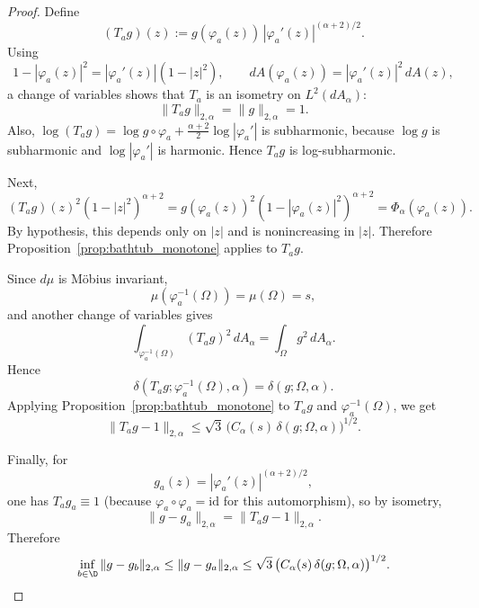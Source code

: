 \begin{proof}
Define
\[
(T_ag)(z):=g(\varphi_a(z))\,|\varphi_a'(z)|^{(\alpha+2)/2}.
\]
Using
\[
1-|\varphi_a(z)|^2 = |\varphi_a'(z)|(1-|z|^2),
\qquad
dA(\varphi_a(z))=|\varphi_a'(z)|^2\,dA(z),
\]
a change of variables shows that $T_a$ is an isometry on $L^2(dA_\alpha)$:
\[
\|T_ag\|_{2,\alpha}=\|g\|_{2,\alpha}=1.
\]
Also, $\log(T_ag)=\log g\circ \varphi_a + \frac{\alpha+2}{2}\log|\varphi_a'|$ is subharmonic,
because $\log g$ is subharmonic and $\log|\varphi_a'|$ is harmonic. Hence $T_ag$ is log-subharmonic.

Next,
\[
(T_ag)(z)^2(1-|z|^2)^{\alpha+2}
=
g(\varphi_a(z))^2(1-|\varphi_a(z)|^2)^{\alpha+2}
=
\Phi_\alpha(\varphi_a(z)).
\]
By hypothesis, this depends only on $|z|$ and is nonincreasing in $|z|$.
Therefore Proposition~\ref{prop:bathtub_monotone} applies to $T_ag$.

Since $d\mu$ is Möbius invariant,
\[
\mu(\varphi_a^{-1}(\Omega))=\mu(\Omega)=s,
\]
and another change of variables gives
\[
\int_{\varphi_a^{-1}(\Omega)} (T_ag)^2\,dA_\alpha
=
\int_\Omega g^2\,dA_\alpha.
\]
Hence
\[
\delta(T_ag;\varphi_a^{-1}(\Omega),\alpha)=\delta(g;\Omega,\alpha).
\]
Applying Proposition~\ref{prop:bathtub_monotone} to $T_ag$ and $\varphi_a^{-1}(\Omega)$, we get
\[
\|T_ag-1\|_{2,\alpha}
\le
\sqrt{3}\,\bigl(C_\alpha(s)\,\delta(g;\Omega,\alpha)\bigr)^{1/2}.
\]

Finally, for
\[
g_a(z)=|\varphi_a'(z)|^{(\alpha+2)/2},
\]
one has $T_a g_a\equiv 1$ (because $\varphi_a\circ\varphi_a=\mathrm{id}$ for this automorphism),
so by isometry,
\[
\|g-g_a\|_{2,\alpha}=\|T_ag-1\|_{2,\alpha}.
\]
Therefore
\[
\inf_{b\in\D}\|g-g_b\|_{2,\alpha}
\le \|g-g_a\|_{2,\alpha}
\le \sqrt{3}\,\bigl(C_\alpha(s)\,\delta(g;\Omega,\alpha)\bigr)^{1/2}.
\]
\end{proof}
